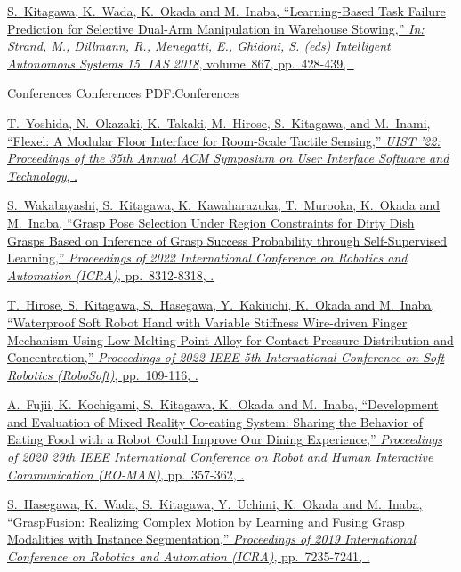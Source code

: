 \documentclass[letterpaper,MMMyyyy,nonstopmode]{simpleresumecv}
\begin{document}
\begin{Body}
\begingroup

\BulletItem
\href{https://doi.org/10.1007/978-3-030-01370-7_34}
{\underline{S.~Kitagawa}, K.~Wada, K.~Okada and M.~Inaba,
``Learning-Based Task Failure Prediction for Selective Dual-Arm Manipulation in Warehouse Stowing,''
\textit{In: Strand, M., Dillmann, R., Menegatti, E., Ghidoni, S. (eds) Intelligent Autonomous Systems 15. IAS 2018},
volume~867,
pp.~428-439,
.}

\endgroup

\BigGap
\SubSection
{Conferences}
{Conferences}
{PDF:Conferences}

\begingroup

\BulletItem
\href{https://doi.org/10.1145/3526113.3545699}
{T.~Yoshida, N.~Okazaki, K.~Takaki, M.~Hirose, \underline{S.~Kitagawa}, and M.~Inami,
``Flexel: A Modular Floor Interface for Room-Scale Tactile Sensing,''
\textit{UIST '22: Proceedings of the 35th Annual ACM Symposium on User Interface Software and Technology},
.}

\BulletItem
\href{https://doi.org/10.1109/ICRA46639.2022.9812084}
{S.~Wakabayashi, \underline{S.~Kitagawa}, K.~Kawaharazuka, T.~Murooka, K.~Okada and M.~Inaba,
``Grasp Pose Selection Under Region Constraints for Dirty Dish Grasps Based on Inference of Grasp Success Probability through Self-Supervised Learning,''
\textit{Proceedings of 2022 International Conference on Robotics and Automation (ICRA)},
pp.~8312-8318,
.}

\BulletItem
\href{https://doi.org/10.1109/RoboSoft54090.2022.9762208}
{T.~Hirose, \underline{S.~Kitagawa}, S.~Hasegawa, Y.~Kakiuchi, K.~Okada and M.~Inaba,
``Waterproof Soft Robot Hand with Variable Stiffness Wire-driven Finger Mechanism Using Low Melting Point Alloy for Contact Pressure Distribution and Concentration,''
\textit{Proceedings of 2022 IEEE 5th International Conference on Soft Robotics (RoboSoft)},
pp.~109-116,
.}

\BulletItem
\href{https://doi.org/10.1109/RO-MAN47096.2020.9223518}
{A.~Fujii, K.~Kochigami, \underline{S.~Kitagawa}, K.~Okada and M.~Inaba,
``Development and Evaluation of Mixed Reality Co-eating System: Sharing the Behavior of Eating Food with a Robot Could Improve Our Dining Experience,''
\textit{Proceedings of 2020 29th IEEE International Conference on Robot and Human Interactive Communication (RO-MAN)},
pp.~357-362,
.}

\BulletItem
\href{https://doi.org/10.1109/ICRA.2019.8793710}
{S.~Hasegawa, K.~Wada, \underline{S.~Kitagawa}, Y.~Uchimi, K.~Okada and M.~Inaba,
``GraspFusion: Realizing Complex Motion by Learning and Fusing Grasp Modalities with Instance Segmentation,''
\textit{Proceedings of 2019 International Conference on Robotics and Automation (ICRA)},
pp.~7235-7241,
.}


\end{Body}
\end{document}

